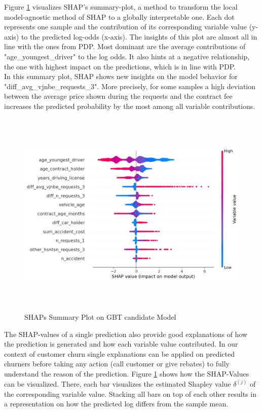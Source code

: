\documentclass[12pt,titlepage]{article}
\begin{document}
Figure \ref{fig:shapsum} visualizes SHAP's summary-plot, a method  to transform the local model-agnostic method of SHAP to a globally interpretable one. Each dot represents one sample and the contribution of its corresponding variable value (y-axis) to the predicted log-odds (x-axis). The insights of this plot are almost all in line with the ones from PDP. Most dominant are the average contributions of "age\_youngest\_driver" to the log odds. It also hints at a negative relationship, the one with highest impact on the predictions, which is in line with PDP. \\
In this summary plot, SHAP shows new insights on the model behavior for "diff\_avg\_vjnbe\_requests\_3". More precisely, for some samples a high deviation between the average price shown during the requests and the contract fee increases the predicted probability by the most among all variable contributions. \\
\begin{figure}[H]
    \centerline{\includegraphics[height=10cm]{shap_summary.png}}
\caption{SHAPs Summary Plot on GBT candidate Model}
\label{fig:shapsum}
\end{figure}
\noindent
The SHAP-values of a single prediction also provide good explanations of how the prediction is generated and how each variable value contributed. In our context of customer churn single explanations can be applied on predicted churners before taking any action (call customer or give rebates) to fully understand the reason of the prediction. Figure \ref{fig:shapsum} shows how the SHAP-Values can be visualized. There, each bar visualizes the estimated Shapley value $\delta^{(j)}$ of the corresponding variable value. Stacking all bars on top of each other results in a representation on how the predicted log differs from the sample mean.\\
\end{document}
